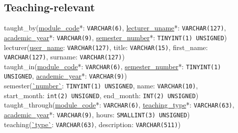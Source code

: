     \subsection{Teaching-relevant}
    taught\_by(\underline{module\_code}*: \texttt{VARCHAR(6)},
    \underline{lecturer\_uname}*: \texttt{VARCHAR(127)},\\
    \underline{academic\_year}*: \texttt{VARCHAR(9)},
    \underline{semester\_number}*: \texttt{TINYINT(1) UNSIGNED})
    \\
    
    lecturer(\underline{user\_name}: \texttt{VARCHAR(127)},
    title: \texttt{VARCHAR(15)},
    first\_name: \texttt{VARCHAR(127)},
    surname: \texttt{VARCHAR(127)})
    \\
    
    taught\_in(\underline{module\_code}*: \texttt{VARCHAR(6)},
    \underline{semester\_number}*: \texttt{TINYINT(1) UNSIGNED},
    \underline{academic\_year}*: \texttt{VARCHAR(9)})
    \\
    
    semester(\underline{\`{}number\`{}}: \texttt{TINYINT(1) UNSIGNED},
    name: \texttt{VARCHAR(10)},\\
    start\_month: \texttt{int(2) UNSIGNED},
    end\_month: \texttt{INT(2) UNSIGNED})
    \\
    
    taught\_through(\underline{module\_code}*: \texttt{VARCHAR(6)},
    \underline{teaching\_type}*: \texttt{VARCHAR(63)},\\
    \underline{academic\_year}*: \texttt{VARCHAR(9)},
    hours: \texttt{SMALLINT(3) UNSIGNED})
    \\
    
    teaching(\underline{\`{}type\`{}}: \texttt{VARCHAR(63)},
    description: \texttt{VARCHAR(511)})

